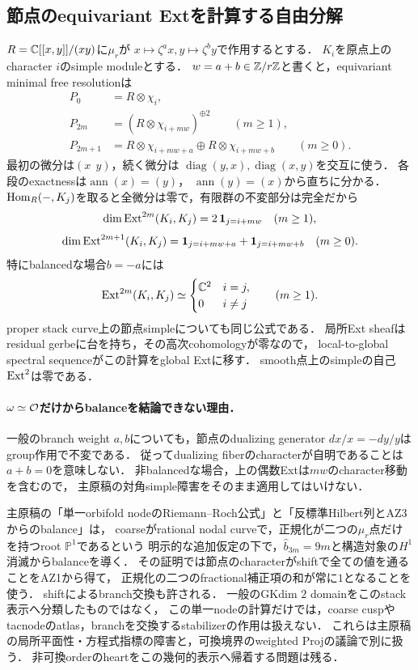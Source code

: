 \documentclass[11pt,a4paper]{ltjsarticle}
\begin{document}
\subsection{節点のequivariant Extを計算する自由分解}

$R=\mathbb C[[x,y]]/(xy)$に$\mu_r$が
$x\mapsto\zeta^a x,y\mapsto\zeta^b y$で作用するとする．
$K_i$を原点上のcharacter $i$のsimple moduleとする．
$w=a+b\in\mathbb Z/r\mathbb Z$と書くと，equivariant minimal free resolutionは
\begin{align*}
 P_0&=R\otimes\chi_i,\\
 P_{2m}&=(R\otimes\chi_{i+mw})^{\oplus2}\qquad(m\geq1),\\
 P_{2m+1}&=R\otimes\chi_{i+mw+a}\oplus R\otimes\chi_{i+mw+b}\qquad(m\geq0).
\end{align*}
最初の微分は$(x\ \ y)$，続く微分は
$\operatorname{diag}(y,x),\operatorname{diag}(x,y)$を交互に使う．
各段のexactnessは$\operatorname{ann}(x)=(y)$，
$\operatorname{ann}(y)=(x)$から直ちに分かる．
$\operatorname{Hom}_R(-,K_j)$を取ると全微分は零で，有限群の不変部分は完全だから
\[
 \dim\operatorname{Ext}^{2m}(K_i,K_j)=2\,\mathbf1_{j=i+mw}\quad(m\geq1),
\]
\[
 \dim\operatorname{Ext}^{2m+1}(K_i,K_j)
 =\mathbf1_{j=i+mw+a}+\mathbf1_{j=i+mw+b}\quad(m\geq0).
\]
特にbalancedな場合$b=-a$には
\begin{equation}\label{eq:v6-balanced-ext}
 \operatorname{Ext}^{2m}(K_i,K_j)\simeq
 \begin{cases}\mathbb C^2&i=j,\\0&i\ne j\end{cases}
 \qquad(m\geq1).
\end{equation}
proper stack curve上の節点simpleについても同じ公式である．
局所Ext sheafはresidual gerbeに台を持ち，その高次cohomologyが零なので，
local-to-global spectral sequenceがこの計算をglobal Extに移す．
smooth点上のsimpleの自己$\operatorname{Ext}^2$は零である．

\paragraph{$\omega\simeq\mathcal O$だけからbalanceを結論できない理由．}
一般のbranch weight $a,b$についても，節点のdualizing generator
$dx/x=-dy/y$はgroup作用で不変である．
従ってdualizing fiberのcharacterが自明であることは$a+b=0$を意味しない．
非balancedな場合，上の偶数Extは$mw$のcharacter移動を含むので，
主原稿の対角simple障害をそのまま適用してはいけない．

主原稿の「単一orbifold nodeのRiemann--Roch公式」と「反標準Hilbert列とAZ3からのbalance」は，
coarseがrational nodal curveで，正規化が二つの$\mu_r$点だけを持つroot $\mathbb P^1$であるという
明示的な追加仮定の下で，$\widehat b_{3m}=9m$と構造対象の$H^1$消滅からbalanceを導く．
その証明では節点のcharacterがshiftで全ての値を通ることをAZ1から得て，
正規化の二つのfractional補正項の和が常に$1$となることを使う．
shiftによるbranch交換も許される．
一般のGKdim $2$ domainをこのstack表示へ分類したものではなく，
この単一nodeの計算だけでは，coarse cuspやtacnodeのatlas，branchを交換するstabilizerの作用は扱えない．
これらは主原稿の局所平面性・方程式指標の障害と，可換境界のweighted Projの議論で別に扱う．
非可換orderのheartをこの幾何的表示へ帰着する問題は残る．
\end{document}
